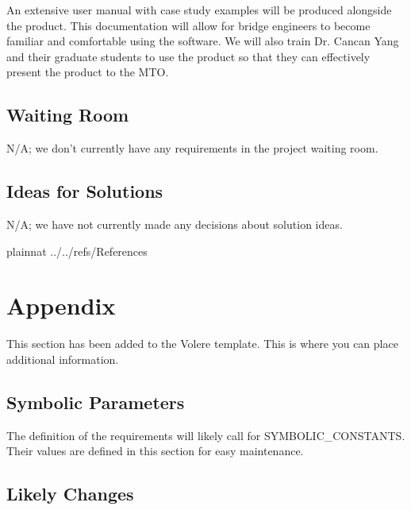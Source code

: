 \documentclass[12pt]{article}
\begin{document}
An extensive user manual with case study examples will be produced alongside the product. This documentation will allow for bridge engineers to become familiar and comfortable using the software.
We will also train Dr. Cancan Yang and their graduate students to use the product so that they can effectively present the product to the MTO.

\subsection{Waiting Room}

N/A; we don't currently have any requirements in the project waiting room.

\subsection{Ideas for Solutions}

N/A; we have not currently made any decisions about solution ideas.

\newpage

 {plainnat}
 {../../refs/References}

\newpage

\section{Appendix}

This section has been added to the Volere template.  This is where you can place
additional information.

\subsection{Symbolic Parameters}

The definition of the requirements will likely call for SYMBOLIC\_CONSTANTS.
Their values are defined in this section for easy maintenance.

\subsection{Likely Changes}
\end{document}
